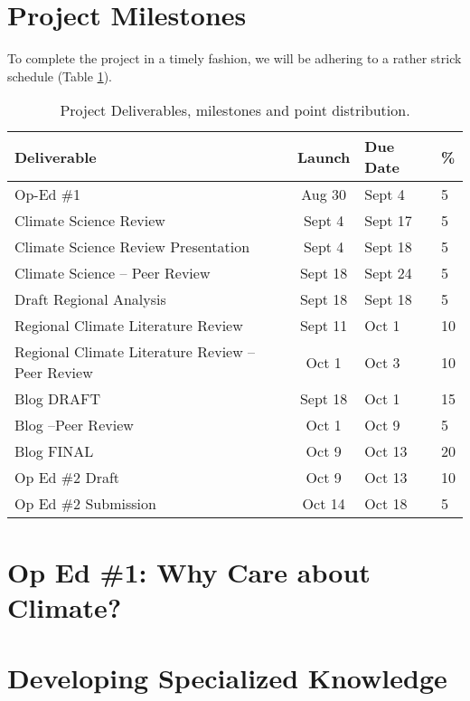 \documentclass{article}\usepackage[]{graphicx}\usepackage[]{color}
\begin{document}
\section{Project Milestones}

To complete the project in a timely fashion, we will be adhering to a rather strick schedule (Table \ref{tab:milestones}).

\begin{table}[h]

\caption{Project Deliverables, milestones and point distribution.}\label{tab:milestones}
\begin{tabular}{lcll}\hline
Deliverable                     & Launch    & Due Date  & \% \\\hline\hline
Op-Ed \#1                   & Aug 30    & Sept 4    & 5 \\
Climate Science Review      & Sept 4    & Sept 17   & 5 \\
Climate Science Review Presentation& Sept 4    & Sept 18   & 5 \\
Climate Science -- Peer Review  & Sept 18 & Sept 24 & 5 \\
Draft Regional Analysis     & Sept 18   & Sept 18   & 5 \\
Regional Climate Literature Review    & Sept 11   & Oct 1   & 10 \\
Regional Climate Literature Review -- Peer Review & Oct 1   & Oct 3 & 10 \\
Blog DRAFT                  & Sept 18   & Oct 1    & 15 \\
Blog --Peer Review          & Oct 1   & Oct 9     & 5\\
Blog FINAL                  & Oct 9     & Oct 13    & 20 \\
Op Ed \#2 Draft             & Oct 9     & Oct 13    & 10 \\
Op Ed \#2 Submission        & Oct 14    & Oct 18    & 5 \\ \hline
\end{tabular}
\end{table}

\section{Op Ed \#1: Why Care about Climate?}



\section{Developing Specialized Knowledge}
\end{document}
